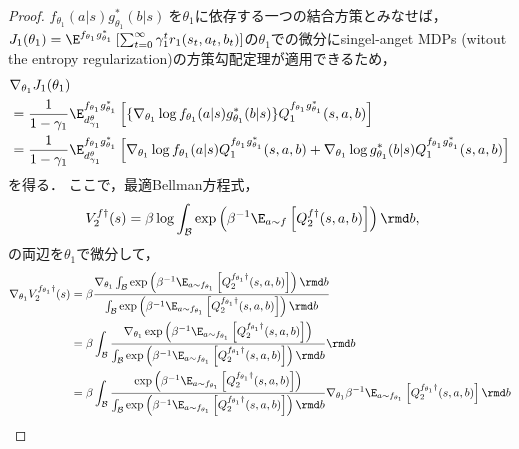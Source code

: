 \documentclass[a4paper,10pt,dvipdfmx]{jsarticle}
\begin{document}
\begin{proof}
$f_{\theta_1}(a|s)g_{\theta_1}^*(b|s)~$を$\theta_1$に依存する一つの結合方策とみなせば，$J_1(\theta_1)=\E^{f_{\theta_1}g_{\theta_1}^*}\left[\sum_{t=0}^\infty \gamma_1^tr_1(s_t,a_t,b_t)\right]$の$\theta_1$での微分にsingel-anget MDPs (witout the entropy regularization)の方策勾配定理が適用できるため，
\begin{subequations}
\begin{align}
    &\nabla_{\theta_1}J_1(\theta_1)\\
    &=\dfrac{1}{1-\gamma_1}\E_{d_{\gamma_1}^{\theta}}^{f_{\theta_1}g_{\theta_1}^*}\left[\{\nabla_{\theta_1}\log f_{\theta_1}(a|s)g_{\theta_1}^*(b|s)\}Q_1^{f_{\theta_1}g_{\theta_1}^*}(s,a,b)\right]\\
    &=\dfrac{1}{1-\gamma_1}\E_{d_{\gamma_1}^{\theta}}^{f_{\theta_1}g_{\theta_1}^*}\left[\nabla_{\theta_1}\log f_{\theta_1}(a|s)Q_1^{f_{\theta_1}g_{\theta_1}^*}(s,a,b)+\nabla_{\theta_1}\log g_{\theta_1}^*(b|s)Q_1^{f_{\theta_1}g_{\theta_1}^*}(s,a,b)\right]\label{eq:nabla_1_J_1_qr_first}
\end{align}
\end{subequations}
を得る．
ここで，最適Bellman方程式，
\begin{align}
    &V_2^{f\dag}(s)=\beta\log\int_{\mathcal{B}}\exp\left(\beta^{-1}\E_{a\sim f}\left[Q_2^{f\dag}(s,a,b)\right]\right)\rmd b,
\end{align}
の両辺を$\theta_1$で微分して，
\begin{subequations}
\begin{align}
    \nabla_{\theta_1}V_2^{f_{\theta_1}\dag}(s)&=\beta\dfrac{\nabla_{\theta_1}\int_{\mathcal{B}}\exp\left(\beta^{-1}\E_{a\sim f_{\theta_1}}\left[Q_2^{f_{\theta_1}\dag}(s,a,b)\right]\right)\rmd b}{\int_{\mathcal{B}}\exp\left(\beta^{-1}\E_{a\sim f_{\theta_1}}\left[Q_2^{f_{\theta_1}\dag}(s,a,b)\right]\right)\rmd b}\\
    &=\beta\int_{\mathcal{B}}\dfrac{\nabla_{\theta_1}\exp\left(\beta^{-1}\E_{a\sim f_{\theta_1}}\left[Q_2^{f_{\theta_1}\dag}(s,a,b)\right]\right)}{\int_{\mathcal{B}}\exp\left(\beta^{-1}\E_{a\sim f_{\theta_1}}\left[Q_2^{f_{\theta_1}\dag}(s,a,b)\right]\right)\rmd b}\rmd b\\
    &=\beta\int_{\mathcal{B}}\dfrac{\exp\left(\beta^{-1}\E_{a\sim f_{\theta_1}}\left[Q_2^{f_{\theta_1}\dag}(s,a,b)\right]\right)}{\int_{\mathcal{B}}\exp\left(\beta^{-1}\E_{a\sim f_{\theta_1}}\left[Q_2^{f_{\theta_1}\dag}(s,a,b)\right]\right)\rmd b}\nabla_{\theta_1}\beta^{-1}\E_{a\sim f_{\theta_1}}\left[Q_2^{f_{\theta_1}\dag}(s,a,b)\right]\rmd b\\

\end{align}
\end{subequations}
\end{proof}
\end{document}
